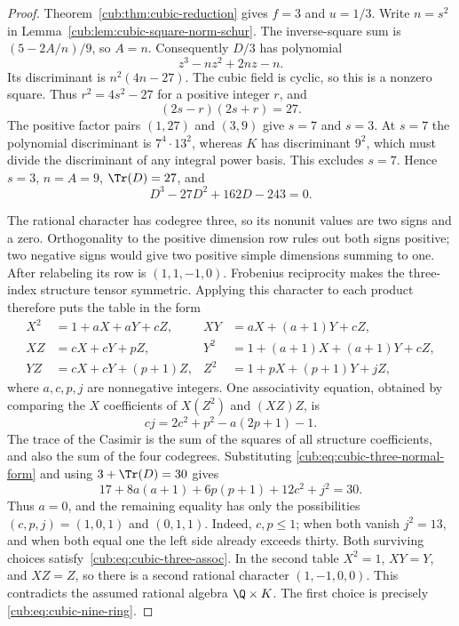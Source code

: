 \begin{proof}
Theorem~\ref{cub:thm:cubic-reduction} gives $f=3$ and $u=1/3$.
Write $n=s^2$ in Lemma~\ref{cub:lem:cubic-square-norm-schur}. The inverse-square
sum is $(5-2A/n)/9$, so $A=n$. Consequently $D/3$ has polynomial
\[
 z^3-nz^2+2nz-n.
\]
Its discriminant is $n^2(4n-27)$. The cubic field is cyclic, so this
is a nonzero square. Thus $r^2=4s^2-27$ for a positive integer $r$,
and
\[
 (2s-r)(2s+r)=27.
\]
The positive factor pairs $(1,27)$ and $(3,9)$ give $s=7$ and $s=3$.
At $s=7$ the polynomial discriminant is $7^4\cdot13^2$, whereas
$K$ has discriminant $9^2$, which must divide the discriminant of any
integral power basis. This excludes $s=7$. Hence $s=3$, $n=A=9$,
$\Tr(D)=27$, and
\begin{equation}\label{cub:eq:cubic-nine-codegree}
 D^3-27D^2+162D-243=0.
\end{equation}

The rational character has codegree three, so its nonunit values are
two signs and a zero. Orthogonality to the positive dimension row
rules out both signs positive; two negative signs would give two
positive simple dimensions summing to one. After relabeling its row
is $(1,1,-1,0)$. Frobenius reciprocity makes the three-index structure
tensor symmetric. Applying this character to each product therefore
puts the table in the form
\begin{equation}\label{cub:eq:cubic-three-normal-form}
\begin{aligned}
 X^2&=1+aX+aY+cZ,& XY&=aX+(a+1)Y+cZ,\\
 XZ&=cX+cY+pZ,&Y^2&=1+(a+1)X+(a+1)Y+cZ,\\
 YZ&=cX+cY+(p+1)Z,&Z^2&=1+pX+(p+1)Y+jZ,
\end{aligned}
\end{equation}
where $a,c,p,j$ are nonnegative integers. One associativity equation,
obtained by comparing the $X$ coefficients of $X(Z^2)$ and $(XZ)Z$,
is
\begin{equation}\label{cub:eq:cubic-three-assoc}
 cj=2c^2+p^2-a(2p+1)-1.
\end{equation}
The trace of the Casimir is the sum of the squares of all structure
coefficients, and also the sum of the four codegrees. Substituting
\eqref{cub:eq:cubic-three-normal-form} and using $3+\Tr(D)=30$ gives
\[
 17+8a(a+1)+6p(p+1)+12c^2+j^2=30.
\]
Thus $a=0$, and the remaining equality has only the possibilities
$(c,p,j)=(1,0,1)$ and $(0,1,1)$. Indeed, $c,p\le1$; when both vanish
$j^2=13$, and when both equal one the left side already exceeds thirty.
Both surviving choices satisfy~\eqref{cub:eq:cubic-three-assoc}.
In the second table $X^2=1$, $XY=Y$, and $XZ=Z$, so there is a second
rational character $(1,-1,0,0)$. This contradicts the assumed rational
algebra $\Q\times K$. The first choice is precisely
\eqref{cub:eq:cubic-nine-ring}.


\end{proof}
